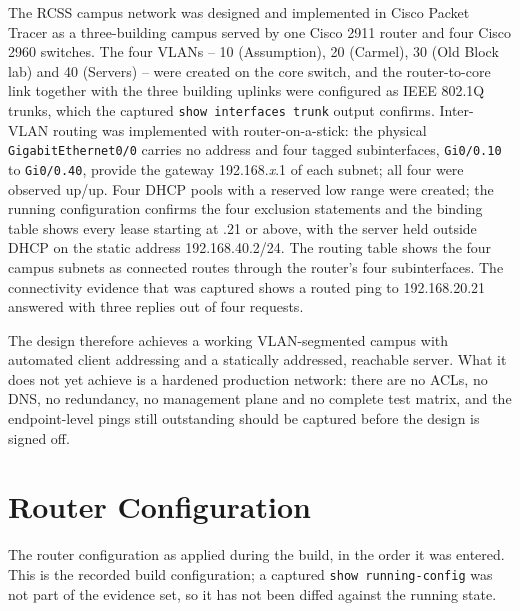 \documentclass[11pt,a4paper]{article}
\begin{document}
\noindent
The RCSS campus network was designed and implemented in Cisco Packet Tracer as a
three-building campus served by one Cisco 2911 router and four Cisco 2960 switches.
The four VLANs -- 10 (Assumption), 20 (Carmel), 30 (Old Block lab) and 40 (Servers) --
were created on the core switch, and the router-to-core link together with the three
building uplinks were configured as IEEE 802.1Q trunks, which the captured
\texttt{show interfaces trunk} output confirms. Inter-VLAN routing was implemented
with router-on-a-stick: the physical \texttt{GigabitEthernet0/0} carries no address and
four tagged subinterfaces, \texttt{Gi0/0.10} to \texttt{Gi0/0.40}, provide the gateway
192.168.\textit{x}.1 of each subnet; all four were observed up/up. Four DHCP pools with
a reserved low range were created; the running configuration confirms the four
exclusion statements and the binding table shows every lease starting at .21 or above,
with the server held outside DHCP on the static address 192.168.40.2/24. The routing
table shows the four campus subnets as connected routes through the router's four
subinterfaces. The connectivity evidence that was captured shows a routed ping to
192.168.20.21 answered with three replies out of four requests.

\noindent
The design therefore achieves a working VLAN-segmented campus with automated client
addressing and a statically addressed, reachable server. What it does not yet achieve
is a hardened production network: there are no ACLs, no DNS, no redundancy, no
management plane and no complete test matrix, and the endpoint-level pings still
outstanding should be captured before the design is signed off.

\appendix

\section{Router Configuration}
\label{app:router}

\noindent
The router configuration as applied during the build, in the order it was entered.
This is the recorded build configuration; a captured \texttt{show running-config} was
not part of the evidence set, so it has not been diffed against the running state.
\end{document}
